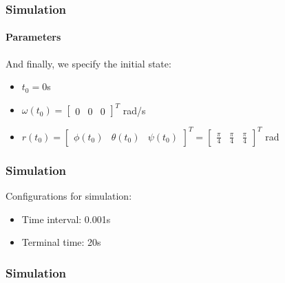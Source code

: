 \documentclass{beamer}
\begin{document}
\begin{frame}
\frametitle{Simulation}
\framesubtitle{Parameters}
And finally, we specify the initial state:
\begin{itemize}
	\item $t_{0}=0$s
	\item $\omega(t_{0})=\begin{bmatrix}
	0&0&0
	\end{bmatrix}^{T}$ rad/s
	\item $r(t_{0})=\begin{bmatrix}
	\phi(t_{0})&\theta(t_{0})&\psi(t_{0})
	\end{bmatrix}^{T}=\begin{bmatrix}
	\frac{\pi}{4}&\frac{\pi}{4}&\frac{\pi}{4}
	\end{bmatrix}^{T}$ rad
\end{itemize}
\end{frame}

\begin{frame}
\frametitle{Simulation}
Configurations for simulation:
\begin{itemize}
	\item Time interval: 0.001s
	\item Terminal time: 20s
\end{itemize}
\end{frame}

\begin{frame}
\frametitle{Simulation}
\begin{figure}[!htb]
\end{figure}
\end{frame}
\end{document}
